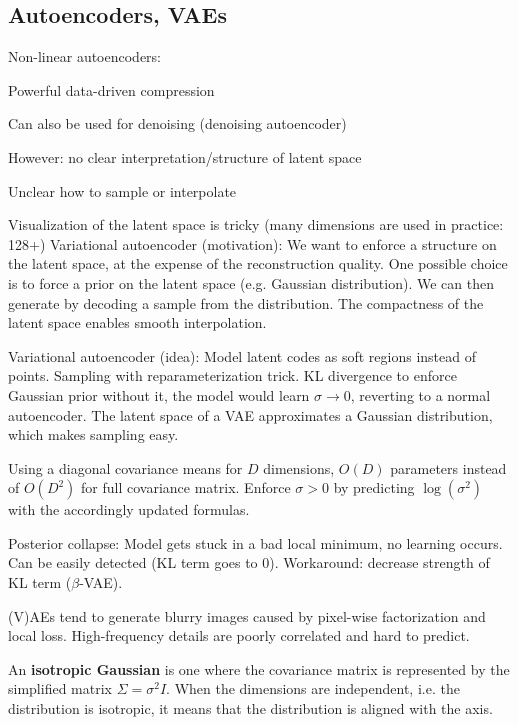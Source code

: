 \documentclass[12pt]{article}
\begin{document}
\subsection{Autoencoders, VAEs}
Non-linear autoencoders:
\ulb
\item Powerful data-driven compression
\item Can also be used for denoising (denoising autoencoder)
\item However: no clear interpretation/structure of latent space
\item Unclear how to sample or interpolate
\item Visualization of the latent space is tricky (many dimensions are used in practice: 128+)
\ule
Variational autoencoder (motivation): We want to enforce a structure on the latent space, at the expense of the reconstruction quality. One possible choice is to force a prior on the latent space (e.g. Gaussian distribution). We can then generate by decoding a sample from the distribution. The compactness of the latent space enables smooth interpolation.
\par Variational autoencoder (idea): Model latent codes as soft regions instead of points. Sampling with reparameterization trick. KL divergence to enforce Gaussian prior \textemdash without it, the model would learn $\sigma\rightarrow 0$, reverting to a normal autoencoder. The latent space of a VAE approximates a Gaussian distribution, which makes sampling easy.
\par Using a diagonal covariance means for $D$ dimensions, $O(D)$ parameters instead of $O(D^2)$ for full covariance matrix. Enforce $\sigma > 0$ by predicting $\log(\sigma^2)$ with the accordingly updated formulas.
\par Posterior collapse: Model gets stuck in a bad local minimum, no learning occurs. Can be easily detected (KL term goes to 0). Workaround: decrease strength of KL term ($\beta$-VAE).
\par (V)AEs tend to generate blurry images caused by pixel-wise factorization and local loss. High-frequency details are poorly correlated and hard to predict.
\par An \textbf{isotropic Gaussian} is one where the covariance matrix is represented by the simplified matrix  $\Sigma = \sigma^2 I$. When the dimensions are independent, i.e. the distribution is isotropic, it means that the distribution is aligned with the axis.
\end{document}

